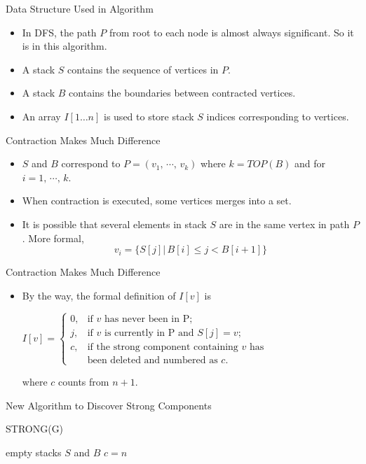 \documentclass{beamer}
\begin{document}
\begin{frame}{Data Structure Used in Algorithm}
	\begin{itemize}
		\item
		In DFS, the \alert{path $P$} from root to each node is almost always significant. So it is in this algorithm.
		\item
		A \alert{stack $S$} contains the sequence of vertices in $P$.
		\item
		A \alert{stack $B$} contains the boundaries between contracted vertices.
		\item
		An array \alert{$I[1\ldots n]$} is used to store stack $S$ indices corresponding to vertices.
	\end{itemize}
\end{frame}

\begin{frame}{Contraction Makes Much Difference}
	\begin{itemize}
		\item
		$S$ and $B$ correspond to $P=(v_1,\,\cdots,\,v_k)$ where $k=TOP(B)$ and for $i=1,\,\cdots,\,k$.
		\item
		When contraction is executed, some vertices merges into a set.
		\item
		It is possible that several elements in stack $S$ are in the same vertex in path $P$.
		More formal, 
		$$v_i=\{S[j]\vert\, B[i]\leq j< B[i+1]\}$$
	\end{itemize}
\end{frame}

\begin{frame}{Contraction Makes Much Difference}
	\begin{itemize}
		\item
		By the way, the formal definition of $I[v]$ is
		\begin{center}
			$I[v]=\begin{cases}
			0, & \text{if }v\text{ has never been in P;} \\
			j, & \text{if }v\text{ is currently in P and }S[j]=v\text{;} \\
			c, & \text{if the strong component containing }v\text{ has}\\
			& \text{been deleted and numbered as }c\text{.}
			\end{cases}$
		\end{center}
		where $c$ counts from $n+1$.
	\end{itemize}
\end{frame}

\begin{frame}[fragile]{New Algorithm to Discover Strong Components}
	\SetAlFnt{\normalsize}
	\begin{procedure}[H]
		\caption{STRONG(G)}
		empty stacks $S$ and $B$\;
		$c=n$\;
	\end{procedure}
\end{frame}
\end{document}
